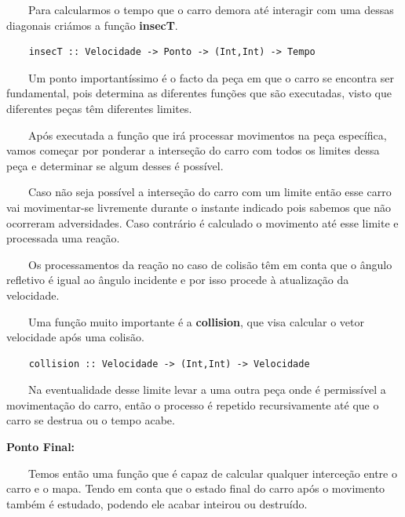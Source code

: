 \documentclass[a4paper]{report} %
\begin{document}
            \par \ \ \ \ Para calcularmos o tempo que o carro demora até interagir com uma dessas diagonais criámos a função \textbf{insecT}.
                            \begin{verbatim}
    insecT :: Velocidade -> Ponto -> (Int,Int) -> Tempo                            
                            \end{verbatim}
            \par \ \ \ \  Um ponto importantíssimo é o facto da peça em que o carro se encontra ser fundamental, pois determina as diferentes funções que são executadas, visto que diferentes peças têm diferentes limites.
            \par \ \ \ \ Após executada a função que irá processar movimentos na peça específica, vamos começar por ponderar a interseção do carro com todos os limites dessa peça e determinar se algum desses é possível.  
            \par \ \ \ \ Caso não seja possível a interseção do carro com um limite então esse carro vai movimentar-se livremente durante o instante indicado pois sabemos que não ocorreram adversidades.   Caso contrário é calculado o movimento até esse limite e processada uma reação.
            \par \ \ \ \ Os processamentos da reação no caso de colisão têm em conta que o ângulo refletivo é igual ao ângulo incidente e por isso procede à atualização da velocidade.
            \par \ \ \ \ Uma função muito importante é a \textbf{collision}, que visa calcular o vetor velocidade após uma colisão.
                                \begin{verbatim}
    collision :: Velocidade -> (Int,Int) -> Velocidade                               
                                \end{verbatim}
            \par \ \ \ \ Na eventualidade desse limite levar a uma outra peça onde é permissível a movimentação do carro, então o processo é repetido recursivamente até que o carro se destrua ou o tempo acabe. 
            \vspace{5mm}
            \par \textbf{ Ponto Final:} 
            \par \ \ \ \ Temos então uma função que é capaz de calcular qualquer interceção entre o carro e o mapa. Tendo em conta que o estado final do carro após o movimento também é estudado, podendo ele acabar inteirou ou destruído. 
                    
\end{document}

